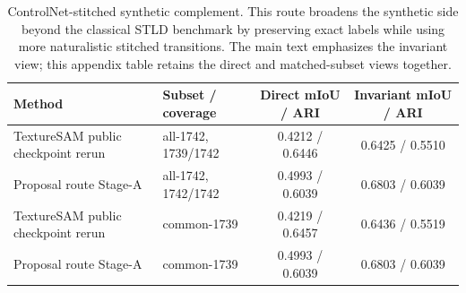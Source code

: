 \begin{table}[t]
\centering
\scriptsize
\begin{tabularx}{\textwidth}{@{}Xlcc@{}}
\toprule
Method & Subset / coverage & Direct mIoU / ARI & Invariant mIoU / ARI \\
\midrule
TextureSAM public checkpoint rerun & all-1742, 1739/1742 & 0.4212 / 0.6446 & 0.6425 / 0.5510 \\
Proposal route Stage-A & all-1742, 1742/1742 & 0.4993 / 0.6039 & 0.6803 / 0.6039 \\
TextureSAM public checkpoint rerun & common-1739 & 0.4219 / 0.6457 & 0.6436 / 0.5519 \\
Proposal route Stage-A & common-1739 & 0.4993 / 0.6039 & 0.6803 / 0.6039 \\
\bottomrule
\end{tabularx}
\caption{ControlNet-stitched synthetic complement. This route broadens the synthetic side beyond the classical STLD benchmark by preserving exact labels while using more naturalistic stitched transitions. The main text emphasizes the invariant view; this appendix table retains the direct and matched-subset views together.}
\label{tab:controlnet_secondary}
\end{table}
